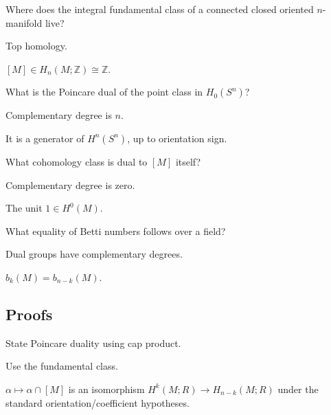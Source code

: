 \begin{exercise}\label{exr:viii33-ped-02}
Where does the integral fundamental class of a connected closed oriented $n$-manifold live?
\end{exercise}
\begin{hint}
Top homology.
\end{hint}
\begin{solution}
$[M]\in H_n(M;\mathbb Z)\cong\mathbb Z$.
\end{solution}

\begin{exercise}\label{exr:viii33-ped-03}
What is the Poincare dual of the point class in $H_0(S^n)$?
\end{exercise}
\begin{hint}
Complementary degree is $n$.
\end{hint}
\begin{solution}
It is a generator of $H^n(S^n)$, up to orientation sign.
\end{solution}

\begin{exercise}\label{exr:viii33-ped-04}
What cohomology class is dual to $[M]$ itself?
\end{exercise}
\begin{hint}
Complementary degree is zero.
\end{hint}
\begin{solution}
The unit $1\in H^0(M)$.
\end{solution}

\begin{exercise}\label{exr:viii33-ped-05}
What equality of Betti numbers follows over a field?
\end{exercise}
\begin{hint}
Dual groups have complementary degrees.
\end{hint}
\begin{solution}
$b_k(M)=b_{n-k}(M)$.
\end{solution}

\subsection*{Proofs}

\begin{exercise}\label{exr:viii33-ped-06}
State Poincare duality using cap product.
\end{exercise}
\begin{hint}
Use the fundamental class.
\end{hint}
\begin{solution}
$\alpha\mapsto \alpha\cap[M]$ is an isomorphism $H^k(M;R)\to H_{n-k}(M;R)$ under the standard orientation/coefficient hypotheses.
\end{solution}

